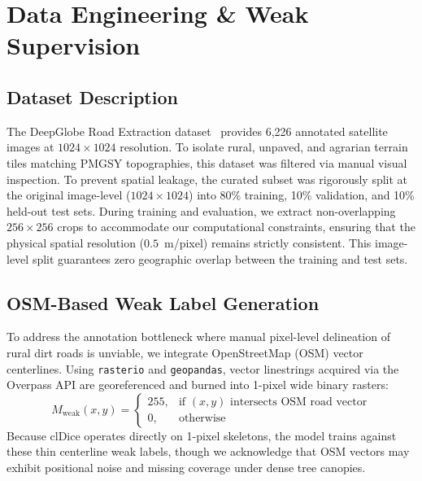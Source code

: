 \documentclass[conference]{IEEEtran}
\begin{document}
\section{Data Engineering \& Weak Supervision}
\label{sec:data}

\subsection{Dataset Description}
The DeepGlobe Road Extraction dataset~\cite{demir2018deepglobe} provides 6,226 annotated satellite images at $1024 \times 1024$ resolution. To isolate rural, unpaved, and agrarian terrain tiles matching PMGSY topographies, this dataset was filtered via manual visual inspection. To prevent spatial leakage, the curated subset was rigorously split at the original image-level ($1024 \times 1024$) into 80\% training, 10\% validation, and 10\% held-out test sets. During training and evaluation, we extract non-overlapping $256 \times 256$ crops to accommodate our computational constraints, ensuring that the physical spatial resolution ($0.5$~m/pixel) remains strictly consistent. This image-level split guarantees zero geographic overlap between the training and test sets.

\subsection{OSM-Based Weak Label Generation}
To address the annotation bottleneck where manual pixel-level delineation of rural dirt roads is unviable, we integrate OpenStreetMap (OSM) vector centerlines. Using \texttt{rasterio} and \texttt{geopandas}, vector linestrings acquired via the Overpass API are georeferenced and burned into 1-pixel wide binary rasters:
\begin{equation}
    M_{\text{weak}}(x, y) = \begin{cases} 255, & \text{if } (x, y) \text{ intersects OSM road vector} \\ 0, & \text{otherwise} \end{cases}
\end{equation}
Because clDice operates directly on 1-pixel skeletons, the model trains against these thin centerline weak labels, though we acknowledge that OSM vectors may exhibit positional noise and missing coverage under dense tree canopies.
\end{document}
